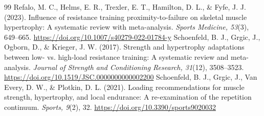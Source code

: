 \documentclass[11pt,a4paper]{article}
\begin{document}
\begin{thebibliography}{99}
 Refalo, M. C., Helms, E. R., Trexler, E. T., Hamilton, D. L., \& Fyfe, J. J. (2023). Influence of resistance training proximity-to-failure on skeletal muscle hypertrophy: A systematic review with meta-analysis. \emph{Sports Medicine, 53}(3), 649--665. \url{https://doi.org/10.1007/s40279-022-01784-y}
 Schoenfeld, B. J., Grgic, J., Ogborn, D., \& Krieger, J. W. (2017). Strength and hypertrophy adaptations between low- vs. high-load resistance training: A systematic review and meta-analysis. \emph{Journal of Strength and Conditioning Research, 31}(12), 3508--3523. \url{https://doi.org/10.1519/JSC.0000000000002200}
 Schoenfeld, B. J., Grgic, J., Van Every, D. W., \& Plotkin, D. L. (2021). Loading recommendations for muscle strength, hypertrophy, and local endurance: A re-examination of the repetition continuum. \emph{Sports, 9}(2), 32. \url{https://doi.org/10.3390/sports9020032}
\end{thebibliography}
\end{document}
